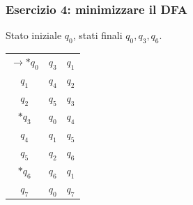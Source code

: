 \begin{frame}
	\frametitle{Esercizio 4: minimizzare il DFA}
	Stato iniziale $q_0$, stati finali $q_0, q_3, q_6$.
	\begin{center}
		\begin{tabular}{c|cc}
			         & \zero  & \uno  \\
			\hline
                        $\to *q_0$    & $q_3$  & $q_1$ \\
			$q_1$    & $q_4$  & $q_2$ \\
			$q_2$    & $q_5$  & $q_3$ \\
                        $*q_3$    & $q_0$  & $q_4$ \\
			$q_4$    & $q_1$  & $q_5$ \\
			$q_5$    & $q_2$  & $q_6$ \\
                        $*q_6$    & $q_6$  & $q_1$ \\
			$q_7$    & $q_0$  & $q_7$ \\
		\end{tabular}
	\end{center}
\end{frame}



